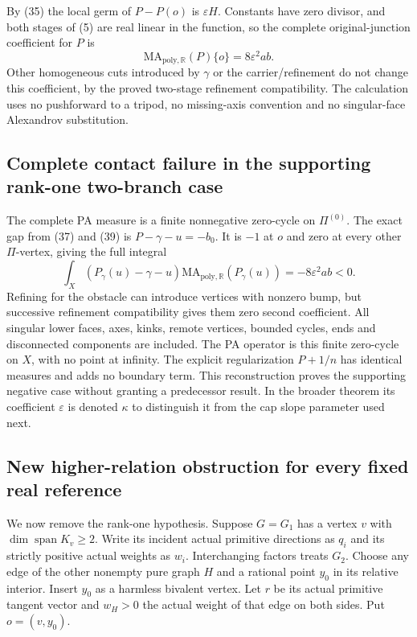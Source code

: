 \documentclass[
  11pt,
]{article}
\begin{document}
By (35) the local germ of \(P-P(o)\) is \(\varepsilon H\). Constants
have zero divisor, and both stages of (5) are real linear in the
function, so the complete original-junction coefficient for \(P\) is \[
                    \mathrm{MA}_{\mathrm{poly},\mathbb{R}}(P)\{o\}
                                  =8\varepsilon^2ab.          \tag{47}
\] Other homogeneous cuts introduced by \(\gamma\) or the
carrier/refinement do not change this coefficient, by the proved
two-stage refinement compatibility. The calculation uses no pushforward
to a tripod, no missing-axis convention and no singular-face Alexandrov
substitution.

\subsection{Complete contact failure in the supporting rank-one
two-branch
case}\label{complete-contact-failure-in-the-supporting-rank-one-two-branch-case}

The complete PA measure is a finite nonnegative zero-cycle on
\(\Pi^{(0)}\). The exact gap from (37) and (39) is \(P-\gamma-u=-b_0\).
It is \(-1\) at \(o\) and zero at every other \(\Pi\)-vertex, giving the
full integral \[
 \int_X(P_\gamma(u)-\gamma-u)
       \mathrm{MA}_{\mathrm{poly},\mathbb{R}}(P_\gamma(u))
                         =-8\varepsilon^2ab<0.              \tag{48}
\] Refining for the obstacle can introduce vertices with nonzero bump,
but successive refinement compatibility gives them zero second
coefficient. All singular lower faces, axes, kinks, remote vertices,
bounded cycles, ends and disconnected components are included. The PA
operator is this finite zero-cycle on \(X\), with no point at infinity.
The explicit regularization \(P+1/n\) has identical measures and adds no
boundary term. This reconstruction proves the supporting negative case
without granting a predecessor result. In the broader theorem its
coefficient \(\varepsilon\) is denoted \(\kappa\) to distinguish it from
the cap slope parameter used next.

\subsection{New higher-relation obstruction for every fixed real
reference}\label{new-higher-relation-obstruction-for-every-fixed-real-reference}

We now remove the rank-one hypothesis. Suppose \(G=G_1\) has a vertex
\(v\) with \(\dim\operatorname{span}K_v\geq2\). Write its incident
actual primitive directions as \(q_i\) and its strictly positive actual
weights as \(w_i\). Interchanging factors treats \(G_2\). Choose any
edge of the other nonempty pure graph \(H\) and a rational point \(y_0\)
in its relative interior. Insert \(y_0\) as a harmless bivalent vertex.
Let \(r\) be its actual primitive tangent vector and \(w_H>0\) the
actual weight of that edge on both sides. Put \(o=(v,y_0)\).
\end{document}
